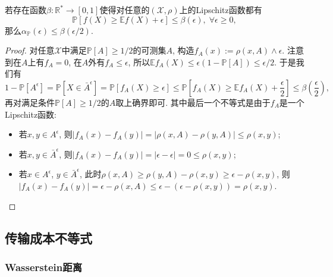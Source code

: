 \begin{theorem}
	若存在函数$\beta \colon \mathbb{R}^* \to [0, 1]$使得对任意的$(\mathcal{X}, \rho)$上的Lipschitz函数都有
	\begin{equation*}
		\mathbb{P}[f(X) \geq \mathbb{E}f(X) + \epsilon] \leq \beta(\epsilon),\; \forall \epsilon \geq 0, 
	\end{equation*}
	那么$\alpha_{\mathbb{P}}(\epsilon) \leq \beta(\epsilon / 2)$. 
\end{theorem}
\begin{proof}
	对任意$\mathcal{X}$中满足$\mathbb{P}[A] \geq 1/2$的可测集$A$, 构造$f_A(x) := \rho(x, A) \wedge \epsilon$. 
	注意到在$A$上有$f_A = 0$, 在$A$外有$f_A \leq \epsilon$, 所以$\mathbb{E}f_A(X) \leq \epsilon (1 - \mathbb{P}[A]) \leq \epsilon / 2$. 
	于是我们有
	\begin{equation*}
		1 - \mathbb{P}[A^\epsilon]
		= \mathbb{P}[X \in \bar A^{\epsilon}]
		= \mathbb{P}[f_A(X) \geq \epsilon] 
		\leq \mathbb{P}\left[f_A(X) \geq \mathbb{E}f_A(X) + \frac{\epsilon}{2}\right]
		\leq \beta\left( \frac{\epsilon}{2} \right),  
	\end{equation*}
	再对满足条件$\mathbb{P}[A] \geq 1/2$的$A$取上确界即可. 
	其中最后一个不等式是由于$f_A$是一个Lipschitz函数: 
	\begin{itemize}
		\item 若$x, y \in A^{\epsilon}$, 则$|f_A(x) - f_A(y)| = |\rho(x, A) - \rho(y, A) | \leq  \rho(x, y)$; 
		\item 若$x, y \in \bar A^{\epsilon}$, 则$|f_A(x) - f_A(y)| = |\epsilon - \epsilon| = 0 \leq \rho(x, y)$;
		\item 若$x \in A^{\epsilon}$, $y \in \bar A^{\epsilon}$, 此时$\rho(x, A) \geq \rho(y, A) - \rho(x, y) \geq \epsilon - \rho(x, y)$, 则$|f_A(x) - f_A(y)| =  \epsilon - \rho(x, A) \leq \epsilon - (\epsilon - \rho(x, y)) = \rho(x, y)$.
	\end{itemize}
\end{proof}


\subsection{传输成本不等式}

\subsubsection{Wasserstein距离}

